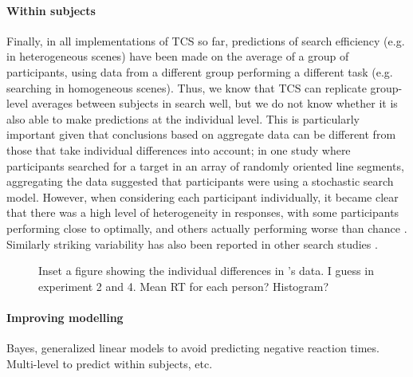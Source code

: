 \documentclass[smallextended]{svjour3}       %
\begin{document}
\paragraph{Within subjects}
Finally, in all implementations of TCS so far, predictions of search efficiency (e.g. in heterogeneous scenes) have been made on the average of a group of participants, using data from a different group performing a different task (e.g. searching in homogeneous scenes). Thus, we know that TCS can replicate group-level averages between subjects in search well, but we do not know whether it is also able to make predictions at the individual level. This is particularly important given that conclusions based on aggregate data can be different from those that take individual differences into account; in one study where participants searched for a target in an array of randomly oriented line segments, aggregating the data suggested that participants were using a stochastic search model. However, when considering each participant individually, it became clear that there was a high level of heterogeneity in responses, with some participants performing close to optimally, and others actually performing worse than chance \cite{nowakowska2017human}. Similarly striking variability has also been reported in other search studies \cite{irons2016choosing, irons2018characterizing}. 

\begin{figure}
\centering
\caption{Inset a figure showing the individual differences in \cite{buetti2019predicting}'s data. I guess in experiment 2 and 4. Mean RT for each person? Histogram?}
\label{fig:buetti2019_a1}
\end{figure}

\paragraph{Improving modelling} Bayes, generalized linear models to avoid predicting negative reaction times. Multi-level to predict within subjects, etc. 
\end{document}
